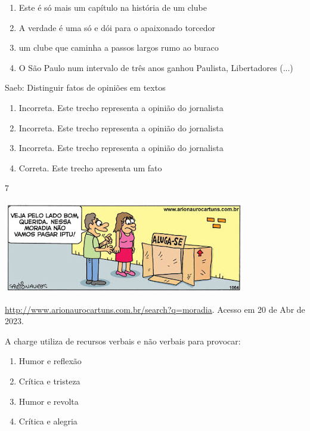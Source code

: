 {{\begin{itemize}
\begin{itemize}
\begin{enumerate}
\def\labelenumi{\alph{enumi})}
\item
  Este é só mais um capítulo na história de um clube
\item
  A verdade é uma só e dói para o apaixonado torcedor
\item
  um clube que caminha a passos largos rumo ao buraco
\item
  O São Paulo num intervalo de três anos ganhou Paulista, Libertadores
  (...)
\end{enumerate}

Saeb: Distinguir fatos de opiniões em textos

\begin{enumerate}
\def\labelenumi{\arabic{enumi}.}
\item
  Incorreta. Este trecho representa a opinião do jornalista
\item
  Incorreta. Este trecho representa a opinião do jornalista
\item
  Incorreta. Este trecho representa a opinião do jornalista
\item
  Correta. Este trecho apresenta um fato
\end{enumerate}

\num{7}

\includegraphics[width=4.16667in,height=1.57292in]{./imgSAEB_7_POR/media/image17.png}

\href{http://www.arionaurocartuns.com.br/search?q=moradia}{\uline{http://www.arionaurocartuns.com.br/search?q=moradia}}.
Acesso em 20 de Abr de 2023.

A charge utiliza de recursos verbais e não verbais para provocar:

\begin{enumerate}
\def\labelenumi{\alph{enumi})}
\item
  Humor e reflexão
\item
  Crítica e tristeza
\item
  Humor e revolta
\item
  Crítica e alegria
\end{enumerate}


\end{itemize}
\end{itemize}}}
